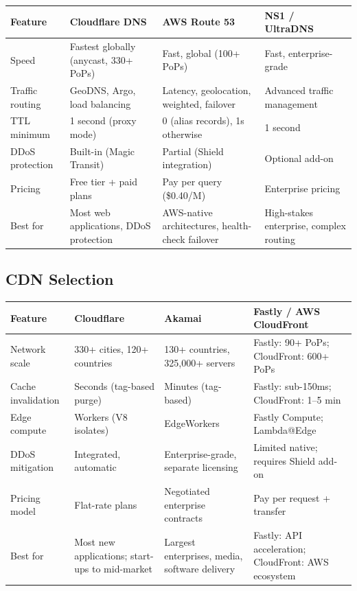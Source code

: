 \documentclass[11pt,a4paper]{article}
\begin{document}
\begin{center}
\small
\begin{tabularx}{\textwidth}{@{}lXXX@{}}
\toprule
\textbf{Feature} & \textbf{Cloudflare DNS} & \textbf{AWS Route 53} & \textbf{NS1 / UltraDNS} \\
\midrule
Speed & Fastest globally (anycast, 330+ PoPs) & Fast, global (100+ PoPs) & Fast, enterprise-grade \\
Traffic routing & GeoDNS, Argo, load balancing & Latency, geolocation, weighted, failover & Advanced traffic management \\
TTL minimum & 1 second (proxy mode) & 0 (alias records), 1s otherwise & 1 second \\
DDoS protection & Built-in (Magic Transit) & Partial (Shield integration) & Optional add-on \\
Pricing & Free tier + paid plans & Pay per query (\$0.40/M) & Enterprise pricing \\
Best for & Most web applications, DDoS protection & AWS-native architectures, health-check failover & High-stakes enterprise, complex routing \\
\bottomrule
\end{tabularx}
\end{center}

\subsection{CDN Selection}

\begin{center}
\small
\begin{tabularx}{\textwidth}{@{}lXXX@{}}
\toprule
\textbf{Feature} & \textbf{Cloudflare} & \textbf{Akamai} & \textbf{Fastly / AWS CloudFront} \\
\midrule
Network scale & 330+ cities, 120+ countries & 130+ countries, 325,000+ servers & Fastly: 90+ PoPs; CloudFront: 600+ PoPs \\
Cache invalidation & Seconds (tag-based purge) & Minutes (tag-based) & Fastly: sub-150ms; CloudFront: 1--5 min \\
Edge compute & Workers (V8 isolates) & EdgeWorkers & Fastly Compute; Lambda@Edge \\
DDoS mitigation & Integrated, automatic & Enterprise-grade, separate licensing & Limited native; requires Shield add-on \\
Pricing model & Flat-rate plans & Negotiated enterprise contracts & Pay per request + transfer \\
Best for & Most new applications; start-ups to mid-market & Largest enterprises, media, software delivery & Fastly: API acceleration; CloudFront: AWS ecosystem \\
\bottomrule
\end{tabularx}
\end{center}
\end{document}

